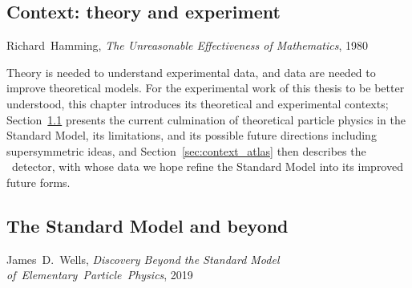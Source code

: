 \begin{singlespacing}
\chapter{Context: theory and experiment}
\label{chapter:context}
%
\begin{epigraphs}
%
{Richard~Hamming,
\textit{The Unreasonable Effectiveness of Mathematics},
1980~\cite{hamming1980unreasonable}}
\end{epigraphs}
\end{singlespacing}

\noindent Theory is needed to understand experimental data,
and data are needed to improve theoretical models.
For the experimental work of this thesis to be better understood, this chapter
introduces its theoretical and experimental contexts;
Section~\ref{sec:context_sm_and_beyond} presents the current culmination of
theoretical particle physics in the Standard Model, its limitations, and its
possible future directions including supersymmetric ideas, and
Section~\ref{sec:context_atlas} then describes the \atlas\ detector, with whose
data we hope refine the Standard Model into its improved future forms.


\begin{singlespacing}
\section{The Standard Model and beyond}
\label{sec:context_sm_and_beyond}
%
\begin{epigraphs}
%
{James~D.~Wells,
\textit{Discovery Beyond the Standard Model of~Elementary~Particle~Physics},
2019~\cite{wells2020discovery}}
\end{epigraphs}
\end{singlespacing}

